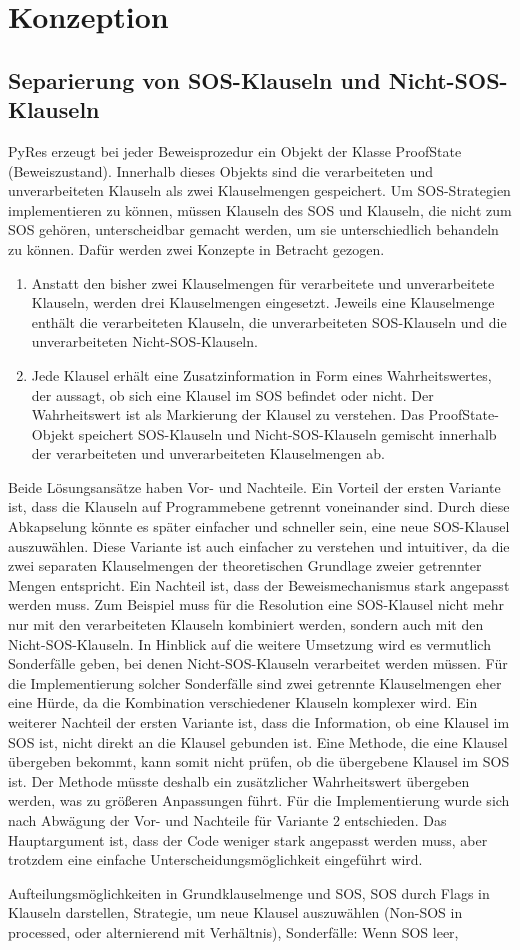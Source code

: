 
\chapter{Konzeption}

\section{Separierung von SOS-Klauseln und Nicht-SOS-Klauseln}

PyRes erzeugt bei jeder Beweisprozedur ein Objekt der Klasse ProofState (Beweiszustand). Innerhalb dieses Objekts sind die verarbeiteten und unverarbeiteten Klauseln als zwei Klauselmengen gespeichert. Um SOS-Strategien implementieren zu können, müssen Klauseln des SOS und Klauseln, die nicht zum SOS gehören, unterscheidbar gemacht werden, um sie unterschiedlich behandeln zu können. Dafür werden zwei Konzepte in Betracht gezogen.
\begin{enumerate}
	\item Anstatt den bisher zwei Klauselmengen für verarbeitete und unverarbeitete Klauseln, werden drei Klauselmengen eingesetzt. Jeweils eine Klauselmenge enthält die verarbeiteten Klauseln, die unverarbeiteten SOS-Klauseln und die unverarbeiteten Nicht-SOS-Klauseln.
	\item Jede Klausel erhält eine Zusatzinformation in Form eines Wahrheitswertes, der aussagt, ob sich eine Klausel im SOS befindet oder nicht. Der Wahrheitswert ist als Markierung der Klausel zu verstehen. Das ProofState-Objekt speichert SOS-Klauseln und Nicht-SOS-Klauseln gemischt innerhalb der verarbeiteten und unverarbeiteten Klauselmengen ab.
\end{enumerate}
Beide Lösungsansätze haben Vor- und Nachteile. Ein Vorteil der ersten Variante ist, dass die Klauseln auf Programmebene getrennt voneinander sind. Durch diese Abkapselung könnte es später einfacher und schneller sein, eine neue SOS-Klausel auszuwählen. Diese Variante ist auch einfacher zu verstehen und intuitiver, da die zwei separaten Klauselmengen der theoretischen Grundlage zweier getrennter Mengen entspricht. Ein Nachteil ist, dass der Beweismechanismus stark angepasst werden muss. Zum Beispiel muss für die Resolution eine SOS-Klausel nicht mehr nur mit den verarbeiteten Klauseln kombiniert werden, sondern auch mit den Nicht-SOS-Klauseln. In Hinblick auf die weitere Umsetzung wird es vermutlich Sonderfälle geben, bei denen Nicht-SOS-Klauseln verarbeitet werden müssen. Für die Implementierung solcher Sonderfälle sind zwei getrennte Klauselmengen eher eine Hürde, da die Kombination verschiedener Klauseln komplexer wird. Ein weiterer Nachteil der ersten Variante ist, dass die Information, ob eine Klausel im SOS ist, nicht direkt an die Klausel gebunden ist. Eine Methode, die eine Klausel übergeben bekommt, kann somit nicht prüfen, ob die übergebene Klausel im SOS ist. Der Methode müsste deshalb ein zusätzlicher Wahrheitswert übergeben werden, was zu größeren Anpassungen führt.
Für die Implementierung wurde sich nach Abwägung der Vor- und Nachteile für Variante 2 entschieden. Das Hauptargument ist, dass der Code weniger stark angepasst werden muss, aber trotzdem eine einfache Unterscheidungsmöglichkeit eingeführt wird.


Aufteilungsmöglichkeiten in Grundklauselmenge und SOS, SOS durch Flags in Klauseln darstellen, Strategie, um neue Klausel auszuwählen (Non-SOS in processed, oder alternierend mit Verhältnis),
Sonderfälle: Wenn SOS leer, 